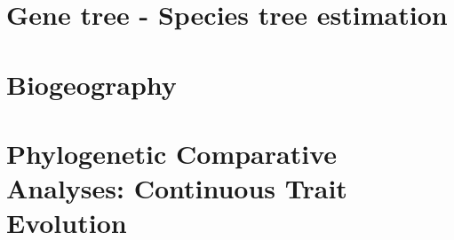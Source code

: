\documentclass[11pt]{book}
\begin{document}
\chapter{Gene tree - Species tree estimation}



\chapter{Biogeography}



\chapter{Phylogenetic Comparative Analyses: Continuous Trait Evolution}

\end{document}
